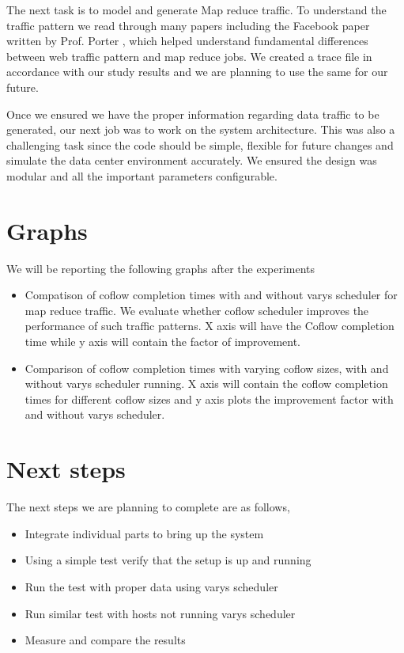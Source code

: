 \documentclass{article}
\begin{document}
The next task is to model and generate Map reduce traffic. To understand the traffic pattern we read through many papers including the Facebook paper written by Prof. Porter \cite{facebook}, which helped understand fundamental differences between web traffic pattern and map reduce jobs. We created a trace file in accordance with our study results and we are planning to use the same for our future.

Once we ensured we have the proper information regarding data traffic to be generated, our next job was to work on the system architecture. This was also a challenging task since the code should be simple, flexible for future changes and simulate the data center environment accurately. We ensured the design was modular and all the important parameters configurable.

\section{Graphs}
We will be reporting the following graphs after the experiments
\begin{itemize}
\item Compatison of coflow completion times with and without varys scheduler for map reduce traffic. We evaluate whether coflow scheduler improves the performance of such traffic patterns. X axis will have the Coflow completion time while y axis will contain the factor of improvement.
\item Comparison of coflow completion times with varying coflow sizes, with and without varys scheduler running. X axis will contain the coflow completion times for different coflow sizes and y axis plots the improvement factor with and without varys scheduler.
\end{itemize}

\section{Next steps}

The next steps we are planning to complete are as follows,

\begin{itemize}
\item Integrate individual parts to bring up the system
\item Using a simple test verify that the setup is up and running
\item Run the test with proper data using varys scheduler
\item Run similar test with hosts not running varys scheduler
\item Measure and compare the results
\end{itemize}
\end{document}
